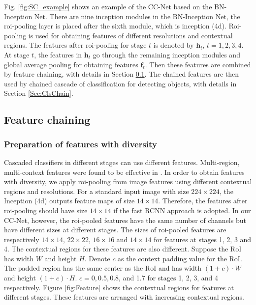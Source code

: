 \documentclass[10pt,twocolumn,letterpaper]{article}
\begin{document}
Fig. \ref{fig:SC_example} shows an example of the CC-Net based on the BN-Inception Net. There are nine inception modules in the BN-Inception Net, the roi-pooling layer is placed after the sixth module, which is inception (4d). Roi-pooling is used for obtaining features of different resolutions and contextual regions. The features after roi-pooling for stage $t$ is denoted by $\mathbf{h}_t$, $t=1, 2, 3, 4$. At stage $t$, the features in $\mathbf{h}_t$ go through the remaining inception modules and global average pooling for obtaining features $\mathbf{f}_t$. Then these features are combined by feature chaining, with details in Section \ref{Sec:FeatChain}. The chained features are then used by chained cascade of classification for detecting objects, with details in Section \ref{Sec:ClsChain}.


\subsection{Feature chaining}
\label{Sec:FeatChain}
\subsubsection{Preparation of features with diversity}
Cascaded classifiers in different stages can use different features. Multi-region, multi-context features were found to be effective in \cite{bell2015inside, gidaris2015object, zeng2016gated}. In order to obtain features with diversity, we apply roi-pooling from image features using different contextual regions and resolutions.  For a standard input image with size $224\times 224$, the Inception (4d) outputs feature maps of size $14\times 14$. Therefore, the features after roi-pooling should have size $14\times 14$ if the fast RCNN approach is adopted. In our CC-Net, however, the roi-pooled features have the same number of channels but have different sizes at different stages. The sizes of roi-pooled features are respectively $14\times 14$, $22\times 22$, $16\times 16$ and $14\times 14$ for features at stages 1, 2, 3 and 4. The contextual regions for these features are also different. Suppose the RoI has width $W$ and height $H$.  Denote $c$ as the context padding value for the RoI. The padded region has the same center as the RoI and has width $(1+c)\cdot W$ and height $(1+c)\cdot H$. $c=0, 0.5,  0.8$, and 1.7 for stages 1, 2, 3, and 4 respectively.  Figure \ref{fig:Feature} shows the contextual regions for features at different stages.  These features are arranged with increasing contextual regions.
\end{document}
